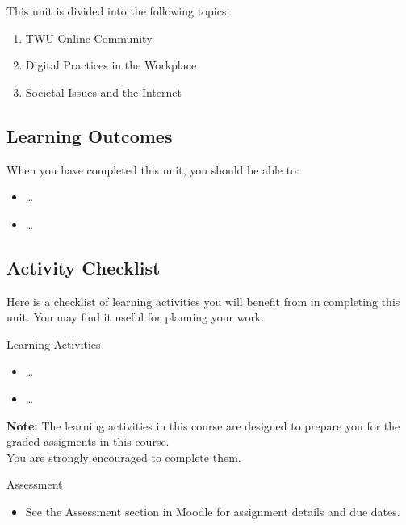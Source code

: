 \documentclass[
]{book}
\providecommand{\tightlist}{%
  \setlength{\itemsep}{0pt}\setlength{\parskip}{0pt}}
\theoremstyle{definition}
\theoremstyle{definition}
\theoremstyle{definition}
\theoremstyle{definition}
\theoremstyle{remark}
\begin{document}
This unit is divided into the following topics:

\begin{enumerate}
\def\labelenumi{\arabic{enumi}.}
\tightlist
\item
  TWU Online Community
\item
  Digital Practices in the Workplace
\item
  Societal Issues and the Internet
\end{enumerate}

\hypertarget{learning-outcomes-5}{%
\subsection*{Learning Outcomes}\label{learning-outcomes-5}}

When you have completed this unit, you should be able to:

\begin{itemize}
\tightlist
\item
  \ldots{}
\item
  \ldots{}
\end{itemize}

\hypertarget{activity-checklist-5}{%
\subsection*{Activity Checklist}\label{activity-checklist-5}}

Here is a checklist of learning activities you will benefit from in completing this unit. You may find it useful for planning your work.

\begin{reflect}
{Learning Activities}

\begin{itemize}
\tightlist
\item
  \ldots{}
\item
  \ldots{}
\end{itemize}

\textbf{Note:} The learning activities in this course are designed to prepare you for the graded assigments in this course.\\
You are strongly encouraged to complete them.
\end{reflect}

\begin{assessment}
{Assessment}

\begin{itemize}
\tightlist
\item
  See the Assessment section in Moodle for assignment details and due dates.
\end{itemize}
\end{assessment}
\end{document}
